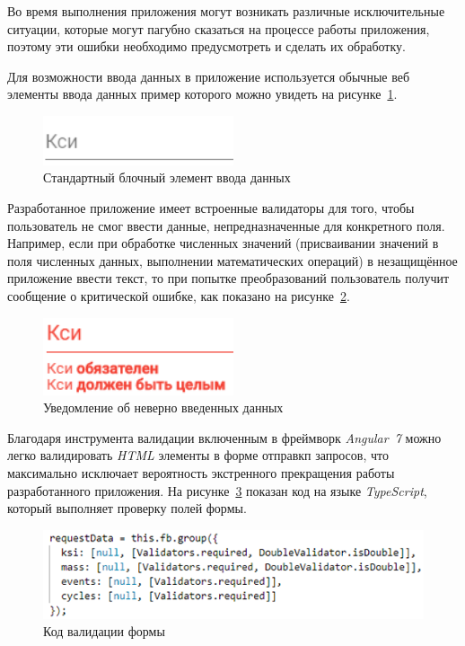 Во время выполнения приложения могут возникать различные исключительные ситуации, которые могут пагубно сказаться на процессе работы приложения, поэтому эти ошибки необходимо предусмотреть и сделать их обработку.

Для возможности ввода данных в приложение используется обычные веб элементы ввода данных пример которого можно увидеть на рисунке~\ref{fig:input-empty}.

\begin{figure}[!h]
	\centering
	\includegraphics[width=0.5\textwidth]{figures/input-empty.png}
	\caption{Стандартный блочный элемент ввода данных}
	\label{fig:input-empty}
\end{figure}

Разработанное приложение имеет встроенные валидаторы для того, чтобы пользователь не смог ввести данные, непредназначенные для конкретного поля. Например, если при обработке численных значений (присваивании значений в поля численных данных, выполнении математических операций) в незащищённое приложение ввести текст, то при попытке преобразований пользователь получит сообщение о критической ошибке, как показано на рисунке~\ref{fig:input-invalid}.

\begin{figure}[!h]
	\centering
	\includegraphics[width=0.5\textwidth]{figures/input-invalid.png}
	\caption{Уведомление об неверно введенных данных}
	\label{fig:input-invalid}
\end{figure}

Благодаря инструмента валидации включенным в фреймворк \textit{Angular~7} можно легко валидировать \textit{HTML} элементы в форме отправкп запросов, что максимально исключает вероятность экстренного прекращения работы разработанного приложения. На рисунке~\ref{fig:validation-code} показан код на языке \textit{TypeScript}, который выполняет проверку полей формы.

\begin{figure}[!h]
	\centering
	\includegraphics[width=\textwidth]{figures/validation-code.png}
	\caption{Код валидации формы}
	\label{fig:validation-code}
\end{figure}

